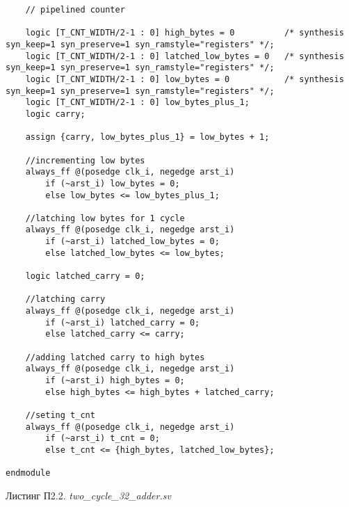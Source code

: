 \begin{lstlisting}
	// pipelined counter

	logic [T_CNT_WIDTH/2-1 : 0] high_bytes = 0 			/* synthesis syn_keep=1 syn_preserve=1 syn_ramstyle="registers" */;
	logic [T_CNT_WIDTH/2-1 : 0] latched_low_bytes = 0 	/* synthesis syn_keep=1 syn_preserve=1 syn_ramstyle="registers" */;
	logic [T_CNT_WIDTH/2-1 : 0] low_bytes = 0 			/* synthesis syn_keep=1 syn_preserve=1 syn_ramstyle="registers" */;
	logic [T_CNT_WIDTH/2-1 : 0] low_bytes_plus_1;
	logic carry;

	assign {carry, low_bytes_plus_1} = low_bytes + 1;

	//incrementing low bytes
	always_ff @(posedge clk_i, negedge arst_i) 
		if (~arst_i) low_bytes = 0;
		else low_bytes <= low_bytes_plus_1;

	//latching low bytes for 1 cycle
	always_ff @(posedge clk_i, negedge arst_i) 
		if (~arst_i) latched_low_bytes = 0;
		else latched_low_bytes <= low_bytes;

	logic latched_carry = 0;

	//latching carry
	always_ff @(posedge clk_i, negedge arst_i) 
		if (~arst_i) latched_carry = 0;
		else latched_carry <= carry;

	//adding latched carry to high bytes
	always_ff @(posedge clk_i, negedge arst_i)
		if (~arst_i) high_bytes = 0;
		else high_bytes <= high_bytes + latched_carry;

	//seting t_cnt
	always_ff @(posedge clk_i, negedge arst_i) 
		if (~arst_i) t_cnt = 0;
		else t_cnt <= {high_bytes, latched_low_bytes};

endmodule
\end{lstlisting}

\begin{flushright}
Листинг П2.2. \emph{two\_cycle\_32\_adder.sv}
\end{flushright}

